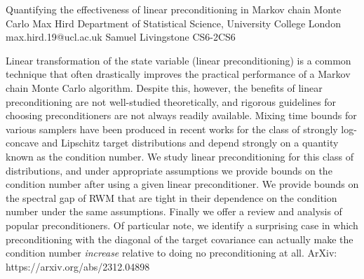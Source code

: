 \begin{talk}
  {Quantifying the effectiveness of linear preconditioning in Markov chain Monte Carlo}%
  {Max Hird}%
  {Department of Statistical Science, University College London}%
  {max.hird.19@ucl.ac.uk}%
  {Samuel Livingstone}%
{}{}{CS6-2}{CS6}

			
Linear transformation of the state variable (linear preconditioning) is a common technique that often drastically improves the practical performance of a Markov chain Monte Carlo algorithm. Despite this, however, the benefits of linear preconditioning are not well-studied theoretically, and rigorous guidelines for choosing preconditioners are not always readily available. Mixing time bounds for various samplers have been produced in recent works for the class of strongly log-concave and Lipschitz target distributions and depend strongly on a quantity known as the condition number. We study linear preconditioning for this class of distributions, and under appropriate assumptions we provide bounds on the condition number after using a given linear preconditioner. We provide bounds on the spectral gap of RWM that are tight in their dependence on the condition number under the same assumptions. Finally we offer a review and analysis of popular preconditioners. Of particular note, we identify a surprising case in which preconditioning with the diagonal of the target covariance can actually make the condition number \emph{increase} relative to doing no preconditioning at all. ArXiv: https://arxiv.org/abs/2312.04898

\medskip
\end{talk}

